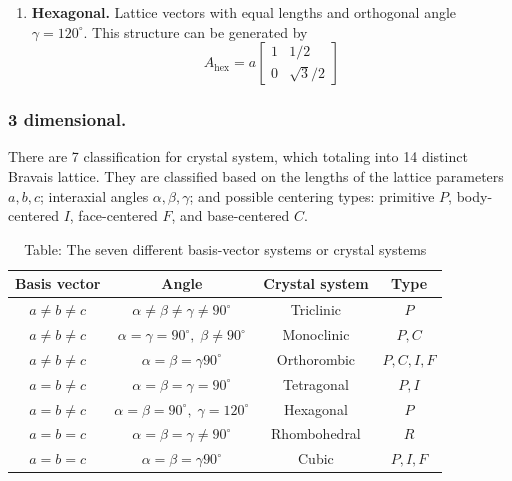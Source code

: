 \documentclass[../../../main.tex]{subfiles}
\begin{document}
\begin{enumerate}
          This structure can be generated by
          \begin{equation*}
              A_{\text{c-rect}} = \frac{1}{2}
              \begin{bmatrix}
                  a & a  \\
                  b & -b
              \end{bmatrix}
          \end{equation*}
    \item \textbf{Hexagonal.} Lattice vectors with equal lengths and orthogonal angle $\gamma =120^\circ$.
          This structure can be generated by
          \begin{equation*}
              A_{\text{hex}} = a
              \begin{bmatrix}
                  1 & 1/2          \\
                  0 & \sqrt{3}/{2}
              \end{bmatrix}
          \end{equation*}
\end{enumerate}

\subsubsection{3 dimensional.}
There are 7 classification for crystal system, which totaling into 14 distinct Bravais lattice.
They are classified based on the lengths of the lattice parameters $a,b,c$; interaxial angles $\alpha,\beta,\gamma$; and possible centering types: primitive $P$, body-centered $I$, face-centered $F$, and base-centered $C$.
\begin{table}[h]
    \centering
    \caption*{Table: The seven different basis-vector systems or crystal systems}
    \begin{tabular}{cccc}
        \toprule
        Basis vector      & Angle                                              & Crystal system & Type      \\
        \midrule
        $a \neq b \neq c$ & $\alpha \neq \beta\neq \gamma \neq 90 ^\circ$      & Triclinic      & $P$       \\
        $a \neq b \neq c$ & $\alpha =\gamma =90 ^\circ,\; \beta\neq 90 ^\circ$ & Monoclinic     & $P,C$     \\
        $a \neq b \neq c$ & $\alpha = \beta= \gamma 90 ^\circ$                 & Orthorombic    & $P,C,I,F$ \\
        $a =b \neq c$     & $\alpha = \beta= \gamma=90 ^\circ$                 & Tetragonal     & $P,I$     \\
        $a =b \neq c$     & $\alpha = \beta= 90 ^\circ,\;\gamma=120 ^\circ$    & Hexagonal      & $P$       \\
        $a =b = c$        & $\alpha=\beta=\gamma \neq 90 ^\circ$               & Rhombohedral   & $R$       \\
        $a =b = c$        & $\alpha=\beta =\gamma90 ^\circ$                    & Cubic          & $P,I,F$   \\
        \bottomrule
    \end{tabular}
\end{table}
\end{document}
